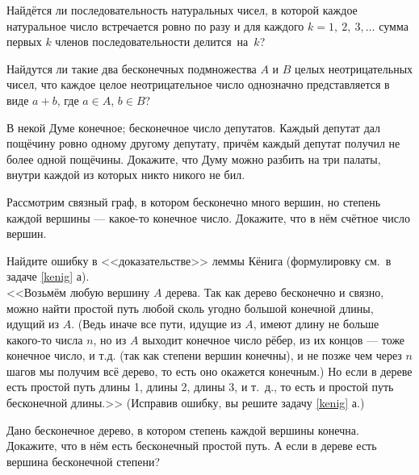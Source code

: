 \documentclass[a4paper,12pt]{article}
\begin{document}
Найдётся ли последовательность натуральных чисел, в которой каждое натуральное число встречается ровно по разу и для каждого $k=1,\ 2,\ 3, \dots$ сумма первых $k$ членов последовательности делится~на~$k$?

Найдутся ли такие два бесконечных
подмножества $A$ и $B$ целых неотрицательных чисел,
что каждое целое неотрицательное число %
однозначно представляется в виде $a+b$, где $a\in A$,
$b\in B$?



В некой Думе  конечное;  бесконечное число депутатов. Каждый депутат дал пощёчину ровно одному другому депутату, причём каждый депутат получил не более одной пощёчины. Докажите, что Думу можно разбить на три палаты, внутри каждой из которых никто никого не бил.

Рассмотрим связный граф, в котором бесконечно много вершин, но степень каждой вершины --- какое-то конечное число. Докажите, что в нём счётное число вершин.

Найдите ошибку в <<доказательстве>> леммы Кёнига (формулировку см.~в задаче \ref{kenig} а).\\ <<Возьмём любую вершину $A$ дерева. Так как дерево бесконечно и связно, можно найти простой путь любой сколь угодно большой конечной длины, идущий из $A$. (Ведь иначе все пути, идущие из $A$, имеют длину не больше какого-то числа $n$, но из $A$ выходит конечное число рёбер, из их концов --- тоже конечное число, и т.д. (так как степени вершин конечны), и не позже чем через $n$ шагов мы получим всё дерево, то есть оно окажется конечным.) Но если в дереве есть простой путь длины 1, длины 2, длины 3, и т.~д., то есть и простой путь бесконечной длины.>>
(Исправив ошибку, вы решите задачу \ref{kenig} а.)

\label{kenig}
Дано бесконечное дерево, в котором степень каждой вершины конечна. Докажите, что в нём есть бесконечный простой путь.
 А если в дереве есть вершина бесконечной степени?




\end{document}
